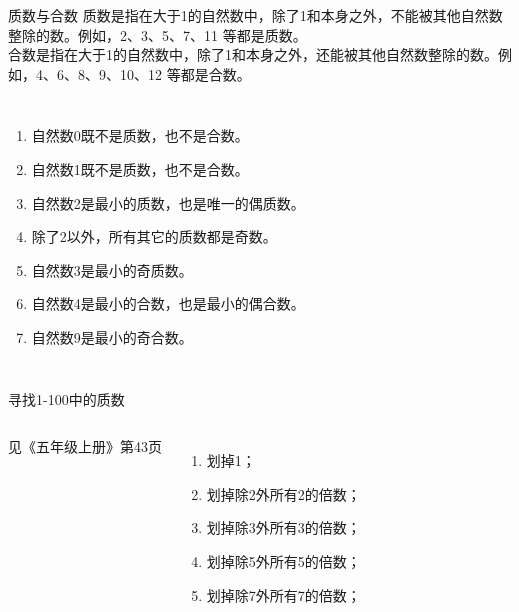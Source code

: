 \documentclass[aspectratio=169]{ctexbeamer} %
\date{\today}
\begin{document}
\begin{frame}[t]{质数与合数}
\alert{质数}是指在\alert{大于1的自然数}中，除了\alert{1和本身}之外，\alert{不能}被其他自然数整除的数。例如，2、3、5、7、11 等都是质数。\\
\alert{合数}是指在\alert{大于1的自然数}中，除了\alert{1和本身}之外，\alert{还能}被其他自然数整除的数。例如，4、6、8、9、10、12 等都是合数。
\begin{columns}
\begin{enumerate}[label={\arabic*.}]
\item 自然数0既\alert{不是质数}，也\alert{不是合数}。 \pause
\item 自然数1既\alert{不是质数}，也\alert{不是合数}。 \pause
\item 自然数2是最小的\alert{质数}，也是唯一的\alert{偶质数}。 \pause
\item \alert{除了2以外}，所有其它的质数都是\alert{奇数}。 \pause
\item 自然数3是最小的\alert{奇质数}。 \pause
\item 自然数4是最小的\alert{合数}，也是最小的\alert{偶合数}。 \pause
\item 自然数9是最小的\alert{奇合数}。
\end{enumerate}
\end{columns}
\end{frame}

\begin{frame}[t]{寻找1-100中的质数}
\begin{columns}
见《五年级上册》第43页
\begin{enumerate}[label={\arabic*.}]
\item 划掉1；
\item 划掉除2外所有2的倍数；
\item 划掉除3外所有3的倍数；
\item 划掉除5外所有5的倍数；
\item 划掉除7外所有7的倍数；
\end{enumerate}
\end{columns}


\end{frame}
\end{document}
